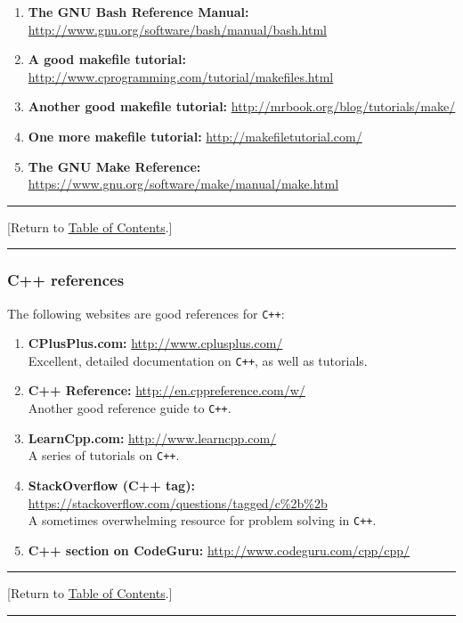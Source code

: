 \documentclass[12pt]{article}
\renewcommand{\v}{\verb}
\newcommand{\TOClink}{\begin{center}\hrule\vskip-10pt\phantom{.}\hfill[Return to \hyperlink{TOC}{Table of Contents}.]\hfill\phantom{.}\vskip3pt\hrule\end{center}}
\begin{document}
\begin{enumerate}
\item \textbf{The GNU Bash Reference Manual:} \href{http://www.gnu.org/software/bash/manual/bash.html}{http://www.gnu.org/software/bash/manual/bash.html}

\item 
\textbf{A good makefile tutorial:} \href{http://www.cprogramming.com/tutorial/makefiles.html}{http://www.cprogramming.com/tutorial/makefiles.html} 

\item 
\textbf{Another good makefile tutorial:} \href{http://mrbook.org/blog/tutorials/make/}{http://mrbook.org/blog/tutorials/make/}

\item 
\textbf{One more makefile tutorial:} \href{http://makefiletutorial.com/}{http://makefiletutorial.com/}

\item
\textbf{The GNU Make Reference:} \href{https://www.gnu.org/software/make/manual/make.html}{https://www.gnu.org/software/make/manual/make.html}

\end{enumerate}
\TOClink 

\subsubsection{C++ references}
The following websites are good references for \v|C++|: 
\begin{enumerate}
\item 
\textbf{CPlusPlus.com:} 
\href{http://www.cplusplus.com/}{http://www.cplusplus.com/}\\
Excellent, detailed documentation on \v|C++|, as well as tutorials. 

\item 
\textbf{C++ Reference:}
\href{http://en.cppreference.com/w/}{http://en.cppreference.com/w/}\\
Another good reference guide to \v|C++|. 

\item 
\textbf{LearnCpp.com:} 
\href{http://www.learncpp.com/}{http://www.learncpp.com/} \\
A series of tutorials on \v|C++|. 

\item 
\textbf{StackOverflow (C++ tag):} 
\href{https://stackoverflow.com/questions/tagged/c%2b%2b}{https://stackoverflow.com/questions/tagged/c\%2b\%2b}\\
A sometimes overwhelming resource for problem solving in \v|C++|. 

\item 
\textbf{C++ section on CodeGuru:} 
\href{http://www.codeguru.com/cpp/cpp/}{http://www.codeguru.com/cpp/cpp/}

\end{enumerate}
\TOClink 
\end{document}
